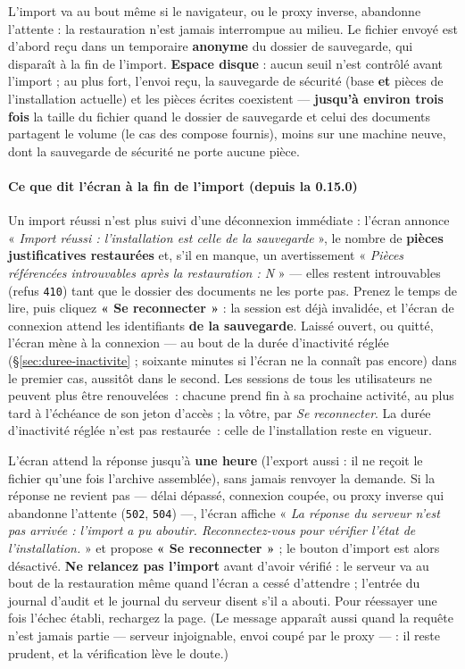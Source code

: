 \documentclass[a4paper,11pt,oneside]{article}
\begin{document}
L'import va au bout même si le navigateur, ou le proxy inverse, abandonne l'attente : la restauration n'est jamais interrompue au milieu. Le fichier envoyé est d'abord reçu dans un temporaire \textbf{anonyme} du dossier de sauvegarde, qui disparaît à la fin de l'import. \textbf{Espace disque} : aucun seuil n'est contrôlé avant l'import ; au plus fort, l'envoi reçu, la sauvegarde de sécurité (base \textbf{et} pièces de l'installation actuelle) et les pièces écrites coexistent --- \textbf{jusqu'à environ trois fois} la taille du fichier quand le dossier de sauvegarde et celui des documents partagent le volume (le cas des compose fournis), moins sur une machine neuve, dont la sauvegarde de sécurité ne porte aucune pièce.

\paragraph{Ce que dit l'écran à la fin de l'import (depuis la 0.15.0)}

Un import réussi n'est plus suivi d'une déconnexion immédiate : l'écran annonce « \emph{Import réussi : l'installation est celle de la sauvegarde} », le nombre de \textbf{pièces justificatives restaurées} et, s'il en manque, un avertissement « \emph{Pièces référencées introuvables après la restauration : N} » --- elles restent introuvables (refus \texttt{410}) tant que le dossier des documents ne les porte pas. Prenez le temps de lire, puis cliquez \textbf{« Se reconnecter »} : la session est déjà invalidée, et l'écran de connexion attend les identifiants \textbf{de la sauvegarde}. Laissé ouvert, ou quitté, l'écran mène à la connexion --- au bout de la durée d'inactivité réglée (\S\ref{sec:duree-inactivite} ; soixante minutes si l'écran ne la connaît pas encore) dans le premier cas, aussitôt dans le second. Les sessions de tous les utilisateurs ne peuvent plus être renouvelées~: chacune prend fin à sa prochaine activité, au plus tard à l'échéance de son jeton d'accès ; la vôtre, par \emph{Se reconnecter}. La durée d'inactivité réglée n'est pas restaurée~: celle de l'installation reste en vigueur.

L'écran attend la réponse jusqu'à \textbf{une heure} (l'export aussi : il ne reçoit le fichier qu'une fois l'archive assemblée), sans jamais renvoyer la demande. Si la réponse ne revient pas --- délai dépassé, connexion coupée, ou proxy inverse qui abandonne l'attente (\texttt{502}, \texttt{504}) ---, l'écran affiche « \emph{La réponse du serveur n'est pas arrivée : l'import a pu aboutir. Reconnectez-vous pour vérifier l'état de l'installation.} » et propose \textbf{« Se reconnecter »} ; le bouton d'import est alors désactivé. \textbf{Ne relancez pas l'import} avant d'avoir vérifié : le serveur va au bout de la restauration même quand l'écran a cessé d'attendre ; l'entrée  du journal d'audit et le journal du serveur disent s'il a abouti. Pour réessayer une fois l'échec établi, rechargez la page. (Le message apparaît aussi quand la requête n'est jamais partie --- serveur injoignable, envoi coupé par le proxy --- : il reste prudent, et la vérification lève le doute.)
\end{document}
